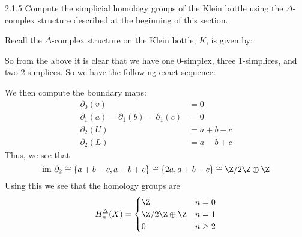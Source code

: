 \documentclass{article}
\newcommand{\im}{\text{im }}
\begin{document}
\begin{exercise}{2.1.5}{\parindent}
  Compute the simplicial homology groups of the Klein bottle using the
  $\Delta$-complex structure described at the beginning of this
  section.
\end{exercise}
\begin{solution}{\parindent}
  Recall the $\Delta$-complex structure on the Klein bottle, $K$, is
  given by:
  \begin{center}
  \end{center}
  So from the above it is clear that we have one 0-simplex, three
  1-simplices, and two 2-simplices. So we have the following exact
  sequence:
  \begin{center}
  \end{center}
  We then compute the boundary maps:
  \begin{align*}
    \partial_0(v) &= 0 \\
    \partial_1(a) = \partial_1(b) = \partial_1(c) &= 0 \\
    \partial_2(U) &= a + b - c \\
    \partial_2(L) &= a - b + c
  \end{align*}
  Thus, we see that 
  \[
  \im \partial_2 \cong \lbrace a+b-c, a-b+c \rbrace \cong \lbrace 2a,
  a+b-c\rbrace \cong \Z/2\Z \oplus \Z
  \]
  Using this we see that the homology groups are
  \[
  H_n^{\Delta}(X) =
  \begin{cases}
    \Z & n = 0 \\
    \Z/2\Z \oplus \Z & n = 1 \\
    0 & n \geq 2
  \end{cases}
  \]
\end{solution}
\end{document}
